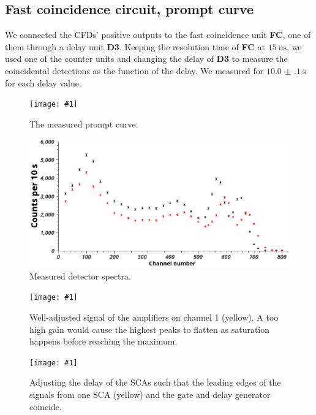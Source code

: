 \documentclass[twocolumn]{article}
\newcommand{\insertFigure}[1]{%
   \texttt{[image: \#1]}%
}
\begin{document}
\subsection{Fast coincidence circuit, prompt curve}
We connected the CFDs' positive outputs to the fast coincidence unit \textbf{FC}, one of them through a delay unit \textbf{D3}. Keeping the resolution time of \textbf{FC} at $\SI{15}{\nano\second}$, we used one of the counter units and changing the delay of \textbf{D3} to measure the coincidental detections as the function of the delay. We measured for $\SI[separate-uncertainty = true]{10.0(1) }{\second}$ for each delay value.
\begin{figure}[!h]
\centering
\insertFigure{prompt_cropped2.png}
\caption{The measured prompt curve.}
\end{figure}
\begin{figure}[!h]
\centering
\includegraphics[width=1.0\linewidth]{detectors2.png}
\caption{Measured detector spectra.}
\end{figure}
\begin{figure}
\centering
\insertFigure{./screenshots/SC08_cropped.png}
\caption{Well-adjusted signal of the amplifiers on channel 1 (yellow). A too high gain would cause the highest peaks to flatten as saturation happens before reaching the maximum.} 
\label{fig:amp}
\end{figure}
\begin{figure}
\centering
\insertFigure{./screenshots/SC07_cropped.png}
\caption{Adjusting the delay of the SCAs such that the leading edges of the signals from one SCA (yellow) and the gate and delay generator coincide.}
\label{fig:sca-overlap}
\end{figure}
\end{document}
